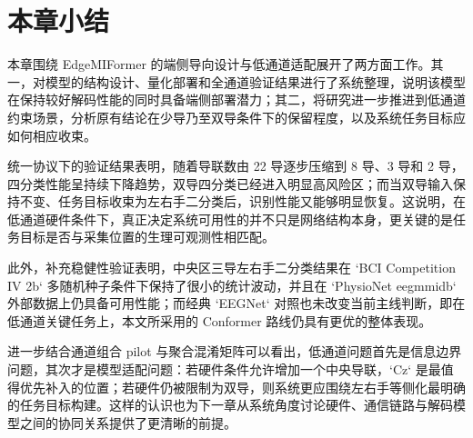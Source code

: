 \section{本章小结}
本章围绕 EdgeMIFormer 的端侧导向设计与低通道适配展开了两方面工作。其一，对模型的结构设计、量化部署和全通道验证结果进行了系统整理，说明该模型在保持较好解码性能的同时具备端侧部署潜力；其二，将研究进一步推进到低通道约束场景，分析原有结论在少导乃至双导条件下的保留程度，以及系统任务目标应如何相应收束。

统一协议下的验证结果表明，随着导联数由 22 导逐步压缩到 8 导、3 导和 2 导，四分类性能呈持续下降趋势，双导四分类已经进入明显高风险区；而当双导输入保持不变、任务目标收束为左右手二分类后，识别性能又能够明显恢复。这说明，在低通道硬件条件下，真正决定系统可用性的并不只是网络结构本身，更关键的是任务目标是否与采集位置的生理可观测性相匹配。

此外，补充稳健性验证表明，中央区三导左右手二分类结果在 `BCI Competition IV 2b` 多随机种子条件下保持了很小的统计波动，并且在 `PhysioNet eegmmidb` 外部数据上仍具备可用性能；而经典 `EEGNet` 对照也未改变当前主线判断，即在低通道关键任务上，本文所采用的 Conformer 路线仍具有更优的整体表现。

进一步结合通道组合 pilot 与聚合混淆矩阵可以看出，低通道问题首先是信息边界问题，其次才是模型适配问题：若硬件条件允许增加一个中央导联，`Cz` 是最值得优先补入的位置；若硬件仍被限制为双导，则系统更应围绕左右手等侧化最明确的任务目标构建。这样的认识也为下一章从系统角度讨论硬件、通信链路与解码模型之间的协同关系提供了更清晰的前提。

